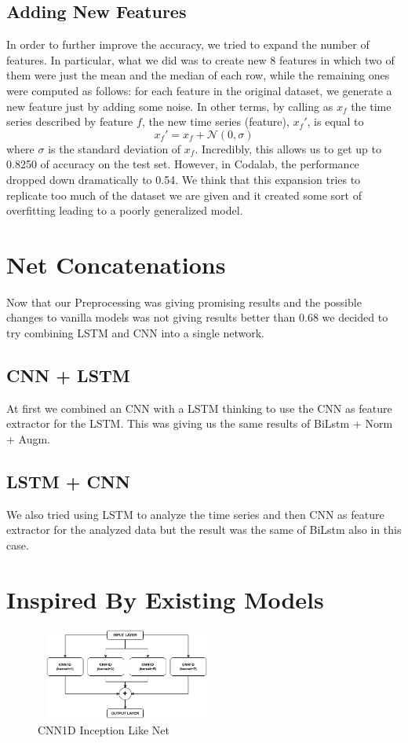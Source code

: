 \documentclass[11pt]{article}
\begin{document}
\subsection{Adding New Features}
In order to further improve the accuracy, we tried to expand the number of features. In particular, what we did was to create new 8 features in which two of them were just the mean and the median of each row, while the remaining ones were computed as follows: for each feature in the original dataset, we generate a new feature just by adding some noise. In other terms, by calling as $x_f$ the time series described by feature $f$, the new time series (feature), $x_f'$, is equal to
\begin{equation*}
    x_f' = x_f + \mathcal{N}(0, \sigma)
\end{equation*}
where $\sigma$ is the standard deviation of $x_f$. Incredibly, this allows us to get up to 0.8250 of accuracy on the test set. However, in Codalab, the performance dropped down dramatically to 0.54. We think that this expansion tries to replicate too much of the dataset we are given and it created some sort of overfitting leading to a poorly generalized model.
\section{Net Concatenations}
Now that our Preprocessing was giving promising results and the possible changes to vanilla models was not giving results better than 0.68
we decided to try combining LSTM and CNN into a single network.
\subsection{CNN + LSTM}
At first we combined an CNN with a LSTM thinking to use the CNN as feature extractor for the LSTM.
This was giving us the same results of BiLstm + Norm + Augm.
\subsection{LSTM + CNN}
We also tried using LSTM to analyze the time series and then CNN as feature extractor for the analyzed data
but the result was the same of BiLstm also in this case.

\section{Inspired By Existing Models}
\begin{figure}[h]
\centering
\includegraphics[width=6cm, height=3cm]{Inception}
\caption{CNN1D Inception Like Net}
\end{figure}
\end{document}
